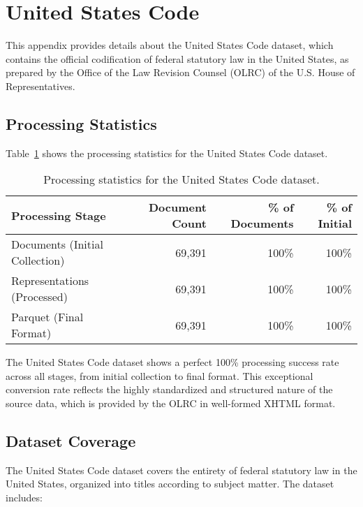 \section{United States Code}
\label{appendix:usc}

This appendix provides details about the United States Code dataset, which contains the official codification of federal statutory law in the United States, as prepared by the Office of the Law Revision Counsel (OLRC) of the U.S. House of Representatives.

\subsection{Processing Statistics}

Table~\ref{table:usc-stats} shows the processing statistics for the United States Code dataset.

\begin{table}[h]
\centering
\begin{tabular}{|l|r|r|r|}
\hline
\textbf{Processing Stage} & \textbf{Document Count} & \textbf{\% of Documents} & \textbf{\% of Initial} \\
\hline
Documents (Initial Collection) & 69,391 & 100\% & 100\% \\
Representations (Processed) & 69,391 & 100\% & 100\% \\
Parquet (Final Format) & 69,391 & 100\% & 100\% \\
\hline
\end{tabular}
\caption{Processing statistics for the United States Code dataset.}
\label{table:usc-stats}
\end{table}

The United States Code dataset shows a perfect 100\% processing success rate across all stages, from initial collection to final format. This exceptional conversion rate reflects the highly standardized and structured nature of the source data, which is provided by the OLRC in well-formed XHTML format.

\subsection{Dataset Coverage}

The United States Code dataset covers the entirety of federal statutory law in the United States, organized into titles according to subject matter. The dataset includes:


